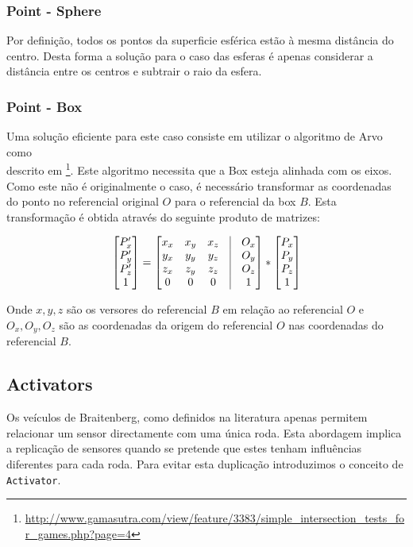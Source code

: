 \documentclass[a4paper]{article}
\begin{document}
\subsubsection{Point - Sphere}
\indent \indent Por definição, todos os pontos da superficie esférica estão à mesma distância do centro.
Desta forma a solução para o caso das esferas é apenas considerar a distância entre os centros e subtrair o raio da esfera.

\subsubsection{Point - Box}
\indent \indent Uma solução eficiente para este caso consiste em utilizar o algoritmo de Arvo como \\ descrito em  \footnote[1]{\url{http://www.gamasutra.com/view/feature/3383/simple_intersection_tests_for_games.php?page=4}}.
Este algoritmo necessita que a Box esteja alinhada com os eixos. Como este não é originalmente o caso, é necessário transformar as coordenadas do ponto no referencial original $O$ para o referencial da box $B$.
Esta transformação é obtida através do seguinte produto de matrizes:

\[
 	\begin{bmatrix}
		P_{x}' \\
		P_{y}' \\
		P_{z}' \\
		1 
	\end{bmatrix}
	=
	\begin{bmatrix}
		x_{x} & x_{y} & x_{z} & \vline & O_{x}	\\
		y_{x} & y_{y} & y_{z} & \vline & O_{y}	\\
		z_{x} & z_{y} & z_{z} & \vline & O_{z}	\\
		0 & 0 & 0 & \vline & 1 	\\
	\end{bmatrix}
	*
 	\begin{bmatrix}
		P_{x} \\
		P_{y} \\
		P_{z} \\
		1 
	\end{bmatrix}
\]

Onde $x, y, z$ são os versores do referencial $B$ em relação ao referencial $O$ e $O_{x}, O_{y}, O_{z}$ são as coordenadas da origem do referencial $O$ nas coordenadas do referencial $B$.

\cleardoublepage
\subsection{Activators}
\indent \indent Os veículos de Braitenberg, como definidos na literatura apenas permitem relacionar um sensor directamente com uma única roda.
Esta abordagem implica a replicação de sensores quando se pretende que estes tenham influências diferentes para cada roda.
Para evitar esta duplicação introduzimos o conceito de \texttt{Activator}. 
\end{document}
